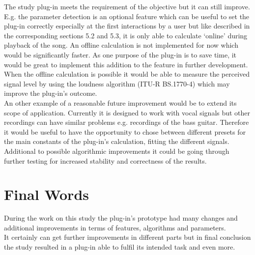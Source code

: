 The study plug-in meets the requirement of the objective but it can still improve.\\
E.g. the parameter detection is an optional feature which can be useful to set the plug-in correctly especially at the first interactions by a user but like described in the corresponding sections 5.2 and 5.3, it is only able to calculate ‘online’ during playback of the song. An offline calculation is not implemented for now which would be significantly faster. As one purpose of the plug-in is to save time, it would be great to implement this addition to the feature in further development. When the offline calculation is possible it would be able to measure the perceived signal level by using the loudness algorithm (ITU-R BS.1770-4) which may improve the plug-in’s outcome.\\
An other example of a reasonable future improvement would be to extend its scope of application. Currently it is designed to work with vocal signals but other recordings can have similar problems e.g. recordings of the bass guitar. Therefore it would be useful to have the opportunity to chose between different presets for the main constants of the plug-in’s calculation, fitting the different signals.\\
Additional to possible algorithmic improvements it could be going through further testing for increased stability and correctness of the results.\\

\section{Final Words}

During the work on this study the plug-in’s prototype had many changes and additional improvements in terms of features, algorithms and parameters.\\
It certainly can get further improvements in different parts but in final conclusion the study resulted in a plug-in able to fulfil its intended task and even more.\\



